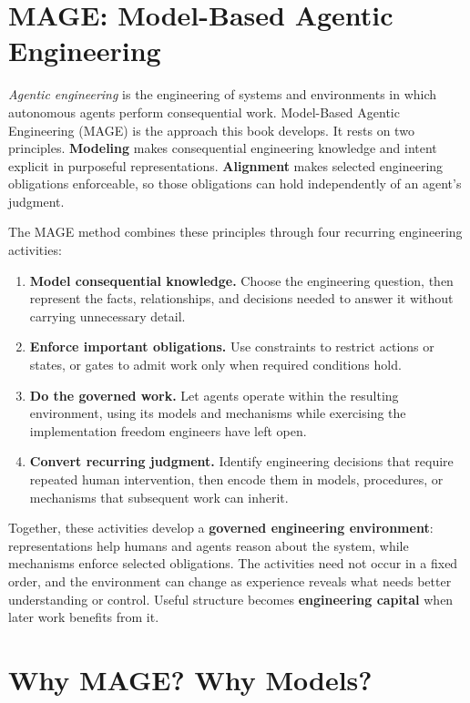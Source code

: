 \section{MAGE: Model-Based Agentic
Engineering}\label{heading:the-mage-method}

\emph{Agentic engineering} is the engineering of systems and
environments in which autonomous agents perform consequential work.
Model-Based Agentic Engineering (MAGE) is the approach this book
develops. It rests on two principles. \textbf{Modeling} makes
consequential engineering knowledge and intent explicit in purposeful
representations. \textbf{Alignment} makes selected engineering
obligations enforceable, so those obligations can hold independently of an agent's judgment.

The MAGE method combines these principles through four recurring
engineering activities:

\begin{enumerate}
\item
  \textbf{Model consequential knowledge.} Choose the engineering
  question, then represent the facts, relationships, and decisions
  needed to answer it without carrying unnecessary detail.
\item
  \textbf{Enforce important obligations.} Use constraints to restrict
  actions or states, or gates to admit work only when required
  conditions hold.
\item
  \textbf{Do the governed work.} Let agents operate within the resulting
  environment, using its models and mechanisms while exercising the
  implementation freedom engineers have left open.
\item
  \textbf{Convert recurring judgment.} Identify engineering decisions that require repeated human intervention, then encode them in models, procedures, or mechanisms that subsequent work can inherit.
\end{enumerate}

Together, these activities develop a \textbf{governed engineering
environment}: representations help humans and agents reason about the
system, while mechanisms enforce selected obligations. The activities
need not occur in a fixed order, and the environment can change as
experience reveals what needs better understanding or control. Useful
structure becomes \textbf{engineering capital} when later work benefits
from it.

\section{Why MAGE? Why Models?}\label{heading:why-mage-why-models}

